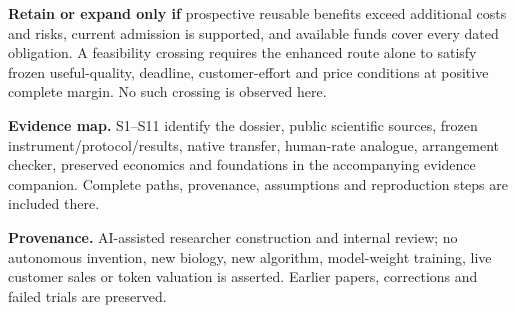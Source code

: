 \documentclass[11pt,letterpaper]{article}
\newcommand{\sourceline}[1]{{\footnotesize\color{Ink}#1\par}}
\begin{document}
\textbf{Retain or expand only if} prospective reusable benefits exceed additional costs and risks, current admission is supported, and available funds cover every dated obligation. A feasibility crossing requires the enhanced route alone to satisfy frozen useful-quality, deadline, customer-effort and price conditions at positive complete margin. No such crossing is observed here.

\vfill
\sourceline{\textbf{Evidence map.} S1--S11 identify the dossier, public scientific sources, frozen instrument/protocol/results, native transfer, human-rate analogue, arrangement checker, preserved economics and foundations in the accompanying evidence companion. Complete paths, provenance, assumptions and reproduction steps are included there.}
\sourceline{\textbf{Provenance.} AI-assisted researcher construction and internal review; no autonomous invention, new biology, new algorithm, model-weight training, live customer sales or token valuation is asserted. Earlier papers, corrections and failed trials are preserved.}
\end{document}
